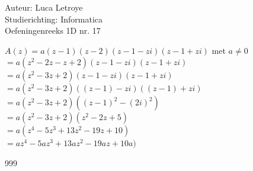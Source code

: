 \documentclass[a4paper]{article}
\begin{document}
  
\noindent \large Auteur: Luca Letroye        \\
\noindent \large Studierichting: Informatica \\
\noindent \large Oefeningenreeks 1D nr. 17 \\

\medskip

\normalsize


$A(z) = a(z-1)(z-2)(z-1-zi)(z-1+zi)  $ met $a \neq 0$ \\

$ = a(z^2-2z-z+2)(z-1-zi)(z-1+zi)$\\

$ = a(z^2-3z+2)(z-1-zi)(z-1+zi)$\\

$ = a(z^2-3z+2)((z-1)-zi)((z-1)+zi)$\\

$ = a(z^2-3z+2)((z-1)^2- (2i)^2)$\\

$ = a(z^2-3z+2)(z^2-2z+5)$\\

$ = a(z^4-5z^3+13z^2-19z+10)$\\

$ = az^4-5az^3+13az^2-19az+10a)$\\



\begin{thebibliography}{999}
\end{thebibliography}
\end{document}
